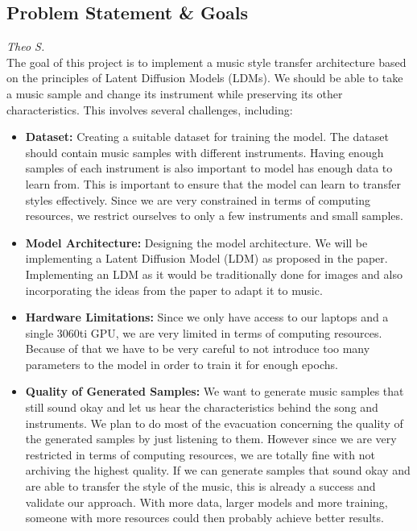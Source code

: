 \subsection{Problem Statement \& Goals}
\textit{Theo S.}\\
The goal of this project is to implement a music style transfer architecture based on the principles of Latent Diffusion Models (LDMs).
We should be able to take a music sample and change its instrument while preserving its other characteristics.
This involves several challenges, including:

\begin{itemize}
    \item \textbf{Dataset:} Creating a suitable dataset for training the model. 
      The dataset should contain music samples with different instruments. Having enough samples of each instrument is also important to 
      model has enough data to learn from. This is important to ensure that the model can learn to transfer styles effectively. 
      Since we are very constrained in terms of computing resources, we restrict ourselves to only a few instruments and small samples.

    \item \textbf{Model Architecture:} Designing the model architecture. 
      We will be implementing a Latent Diffusion Model (LDM) as proposed in the paper.
      Implementing an LDM as it would be traditionally done for images and also incorporating the ideas from the paper to adapt it to music.

    \item \textbf{Hardware Limitations:}
      Since we only have access to our laptops and a single 3060ti GPU, we are very limited in terms of computing resources.
      Because of that we have to be very careful to not introduce too many parameters to the model in order to train it for enough epochs.
      
    \item \textbf{Quality of Generated Samples:}
      We want to generate music samples that still sound okay and let us hear the characteristics behind the song and instruments.
      We plan to do most of the evacuation concerning the quality of the generated samples by just listening to them.
      However since we are very restricted in terms of computing resources, we are totally fine with not archiving the highest quality.
      If we can generate samples that sound okay and are able to transfer the style of the music, this is already a success and validate our approach.
      With more data, larger models and more training, someone with more resources could then probably achieve better results.
\end{itemize}